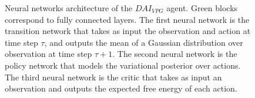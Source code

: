 \documentclass[twoside,11pt]{article}
\makeatletter
\let\oldmathcal\mathcal
\renewcommand{\mathcal}[1]{%
  \IfSubStr{ABCDEFGHIJKLMNOPQRSTUVWXYZ}{#1}{\oldmathcal{#1}}{\mathdutchcal{#1}}
}
\newcommand*\bigcdot{\mathpalette\bigcdot@{.5}}
\newcommand*\bigcdot@[2]{\mathbin{\vcenter{\hbox{\scalebox{#2}{$\m@th#1\bullet$}}}}}
\makeatother
\begin{document}
\begin{figure}[H]
	\begin{center}
	\end{center}
	\caption{Neural networks architecture of the $DAI_{VPG}$ agent. Green blocks correspond to fully connected layers. The first neural network is the transition network that takes as input the observation and action at time step $\tau$, and outputs the mean of a Gaussian distribution over observation at time step $\tau + 1$. The second neural network is the policy network that models the variational posterior over actions. The third neural network is the critic that takes as input an observation and outputs the expected free energy of each action.}
	\label{fig:beren_dnn}
\end{figure}
\end{document}
